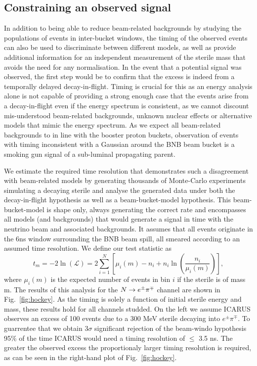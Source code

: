 \documentclass[11pt, a4paper]{article}
\newcommand{\reffig}[1]{Fig.~\ref{#1}}
\def\ster{\ensuremath N}
\begin{document}
\subsection{\label{sec:timing_physics}Constraining an observed signal}

In addition to being able to reduce beam-related backgrounds by studying the
populations of events in inter-bucket windows, the timing of the observed
events can also be used to discriminate between different models, as well as
provide additional information for an independent measurement of the sterile
mass that avoids the need for any normalisation. In the event that a  potential
signal was observed, the first step would be to confirm that the excess is
indeed from a temporally delayed decay-in-flight. Timing is
crucial for this as an energy analysis alone is not capable of providing a strong enough case that the
events arise from a decay-in-flight even if the energy spectrum is consistent,
as we cannot discount mis-understood beam-related backgrounds, unknown nuclear effects or alternative models
that mimic the energy spectrum. As we expect all beam-related backgrounds to in line with the booster proton buckets, observation of events with timing 
inconsistent with a Gaussian around the BNB beam bucket is a smoking gun signal
of a sub-luminal propagating parent. 

We estimate the required time resolution that demonstrates such a disagreement
with beam-related models by generating thousands of Monte-Carlo
experiments simulating a decaying sterile and analyse the generated data under
both the decay-in-flight hypothesis as well as a beam-bucket-model hypothesis.
This beam-bucket-model is shape only, always generating the correct rate and
encompasses all models (and backgrounds) that would generate a signal in time
with the neutrino beam and associated backgrounds. It assumes that all events
originate in the 6ns window surrounding the BNB beam spill, all smeared according
to an assumed time resolution. We define our test statistic  as
\cite{Agashe:2014kda} \[ t_m = -2 \ln \left(\mathcal{L}\right) =  2
\sum_{i=1}^N \left[ \mu_i(m)-n_i +n_i \ln(\frac{n_i}{\mu_i(m)})  \right], \]
where $\mu_i(m)$ is the expected number of events in bin $i$ if the sterile is
of mass m. The results of this analysis for the $\ster \rightarrow e^\pm \pi^\mp$ channel are shown in \reffig{fig:hockey}. As the timing is solely a function of initial sterile energy and mass, these results hold for all channels studded. On the left we assume ICARUS observes an excess of 100 events due to a 300 MeV sterile decaying into $e^\pm \pi^\mp$. To guarrentee that we obtain $3\sigma$ significant rejection of the beam-windo hypothesis 95\% of the time ICARUS would need a timing resolution of $\leq$ 3.5 ns. The greater the observed excess the proportionaly larger timing resolution is required, as can be seen in the right-hand plot of  \reffig{fig:hockey}.
\end{document}
